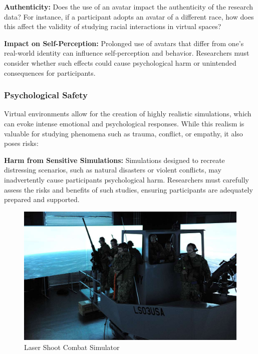 \documentclass[
]{book}
\begin{document}
\textbf{Authenticity:} Does the use of an avatar impact the authenticity of the research data? For instance, if a participant adopts an avatar of a different race, how does this affect the validity of studying racial interactions in virtual spaces?

\textbf{Impact on Self-Perception:} Prolonged use of avatars that differ from one's real-world identity can influence self-perception and behavior. Researchers must consider whether such effects could cause psychological harm or unintended consequences for participants.

\subsubsection{\texorpdfstring{\textbf{Psychological Safety}}{Psychological Safety}}\label{psychological-safety}

Virtual environments allow for the creation of highly realistic simulations, which can evoke intense emotional and psychological responses. While this realism is valuable for studying phenomena such as trauma, conflict, or empathy, it also poses risks:

\textbf{Harm from Sensitive Simulations:} Simulations designed to recreate distressing scenarios, such as natural disasters or violent conflicts, may inadvertently cause participants psychological harm. Researchers must carefully assess the risks and benefits of such studies, ensuring participants are adequately prepared and supported.

\begin{figure}
\centering
\includegraphics[width=1\textwidth,height=\textheight]{images/simulation.jpg}
\caption{Laser Shoot Combat Simulator}
\end{figure}
\end{document}
